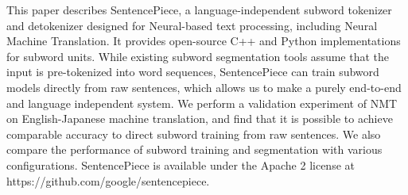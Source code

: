 This paper describes SentencePiece, a language-independent subword tokenizer and detokenizer designed for Neural-based text processing, including Neural Machine Translation. It provides open-source C++ and Python implementations for subword units.  While existing subword segmentation tools assume that the input is pre-tokenized into word sequences, SentencePiece can train subword models directly from raw sentences, which allows us to make a purely end-to-end and language independent system. We perform a validation experiment of NMT on English-Japanese machine translation, and find that it is possible to achieve comparable accuracy to direct subword training from raw sentences. We also compare the performance of subword training and segmentation with various configurations.  SentencePiece is available under the Apache 2 license at https://github.com/google/sentencepiece.

